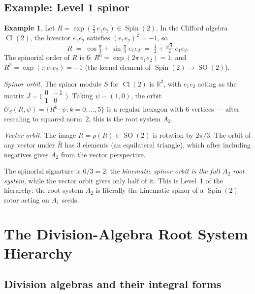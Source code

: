 \documentclass[11pt,reqno]{amsart}
\theoremstyle{plain}
\theoremstyle{definition}
\newtheorem{example}[theorem]{Example}
\theoremstyle{remark}
\newcommand{\R}{\mathbb{R}}
\DeclareMathOperator{\Spin}{Spin}
\DeclareMathOperator{\SO}{SO}
\DeclareMathOperator{\Cl}{Cl}
\begin{document}
\subsection{Example: Level 1 spinor}
\label{sec:level1}

\begin{example}\label{ex:level1}
Let $R = \exp(\tfrac{\pi}{3}\, e_1 e_2) \in \Spin(2)$.
In the Clifford algebra $\Cl(2)$, the bivector $e_1 e_2$
satisfies $(e_1 e_2)^2 = -1$, so
\[
  R \;=\; \cos\tfrac{\pi}{3} + \sin\tfrac{\pi}{3}\; e_1 e_2
    \;=\; \tfrac{1}{2} + \tfrac{\sqrt{3}}{2}\, e_1 e_2.
\]
The spinorial order of $R$ is $6$:
$R^6 = \exp(2\pi\, e_1 e_2) = 1$, and
$R^3 = \exp(\pi\, e_1 e_2) = -1$ (the kernel element of
$\Spin(2) \to \SO(2)$).

\emph{Spinor orbit.}
The spinor module $S$ for $\Cl(2)$ is $\R^2$, with
$e_1 e_2$ acting as the matrix
$J = \bigl(\begin{smallmatrix} 0 & -1 \\ 1 & 0
\end{smallmatrix}\bigr)$.
Taking $\psi = (1, 0)$, the orbit
$\mathcal{O}_S(R, \psi) = \{R^k \cdot \psi : k=0,\ldots,5\}$
is a regular hexagon with $6$ vertices --- after rescaling
to squared norm~$2$, this is the root system $A_2$.

\emph{Vector orbit.}
The image $\bar{R} = \rho(R) \in \SO(2)$ is rotation by
$2\pi/3$.
The orbit of any vector under $\bar{R}$ has $3$ elements
(an equilateral triangle), which after including negatives
gives $A_2$ from the vector perspective.

The spinorial signature is $6/3 = 2$:
the \emph{kinematic spinor orbit is the full $A_2$ root system},
while the vector orbit gives only half of it.
This is Level~1 of the hierarchy: the root system $A_2$
is literally the kinematic spinor of a $\Spin(2)$ rotor
acting on $A_1$ seeds.
\end{example}


\section{The Division-Algebra Root System Hierarchy}
\label{sec:hierarchy}

\subsection{Division algebras and their integral forms}
\end{document}
